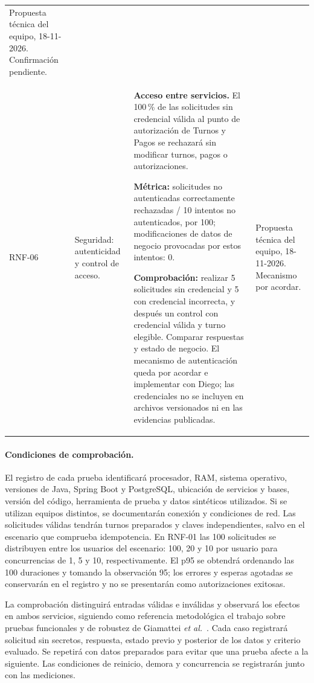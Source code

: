 \documentclass[11pt,a4paper]{article}
\begin{document}
\begin{xltabular}{\textwidth}{lL{3.6cm}XL{2cm}}
  Propuesta técnica del equipo, 18-11-2026. Confirmación pendiente. \\
  RNF-06 & Seguridad: autenticidad y control de acceso. &
  \textbf{Acceso entre servicios.} El 100\,\% de las solicitudes sin credencial válida al punto de autorización de Turnos y Pagos se rechazará sin modificar turnos, pagos o autorizaciones.\par
  \textbf{Métrica:} solicitudes no autenticadas correctamente rechazadas / 10 intentos no autenticados, por 100; modificaciones de datos de negocio provocadas por estos intentos: 0.\par
  \textbf{Comprobación:} realizar 5 solicitudes sin credencial y 5 con credencial incorrecta, y después un control con credencial válida y turno elegible. Comparar respuestas y estado de negocio. El mecanismo de autenticación queda por acordar e implementar con Diego; las credenciales no se incluyen en archivos versionados ni en las evidencias publicadas. &
  Propuesta técnica del equipo, 18-11-2026. Mecanismo por acordar. \\
\end{xltabular}

\paragraph{Condiciones de comprobación.}
El registro de cada prueba identificará procesador, RAM, sistema operativo, versiones de Java, Spring Boot y PostgreSQL, ubicación de servicios y bases, versión del código, herramienta de prueba y datos sintéticos utilizados. Si se utilizan equipos distintos, se documentarán conexión y condiciones de red. Las solicitudes válidas tendrán turnos preparados y claves independientes, salvo en el escenario que comprueba idempotencia. En RNF-01 las 100 solicitudes se distribuyen entre los usuarios del escenario: 100, 20 y 10 por usuario para concurrencias de 1, 5 y 10, respectivamente. El p95 se obtendrá ordenando las 100 duraciones y tomando la observación 95; los errores y esperas agotadas se conservarán en el registro y no se presentarán como autorizaciones exitosas.

La comprobación distinguirá entradas válidas e inválidas y observará los efectos en ambos servicios, siguiendo como referencia metodológica el trabajo sobre pruebas funcionales y de robustez de Giamattei \emph{et al.}~\cite{giamattei2024robustness}. Cada caso registrará solicitud sin secretos, respuesta, estado previo y posterior de los datos y criterio evaluado. Se repetirá con datos preparados para evitar que una prueba afecte a la siguiente. Las condiciones de reinicio, demora y concurrencia se registrarán junto con las mediciones.
\end{document}
